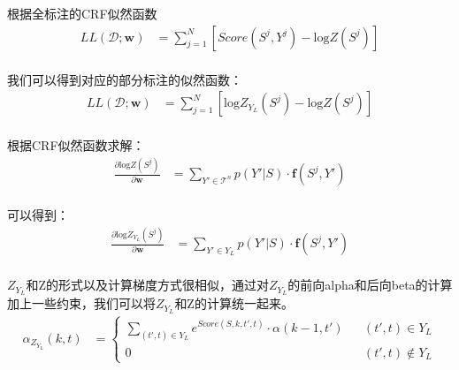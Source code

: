 \documentclass[a4paper, 11pt]{article}
\begin{document}
根据全标注的CRF似然函数
\begin{equation} \label{eq:ll}
\begin{split}
LL(\mathcal{D};\mathbf{w}) &= \sum_{j = 1}^N \left [ \textit{Score}(S^j, Y^j) - \mathrm{log}Z(S^j)\right  ]  \\						  
\end{split}
\end{equation}


我们可以得到对应的部分标注的似然函数：
\begin{equation} \label{eq:partial_ll}
\begin{split}
LL(\mathcal{D};\mathbf{w}) &= \sum_{j = 1}^N \left [\mathrm{log}Z_{Y_L}(S^j) - \mathrm{log}Z(S^j)\right ]  \\                                               
\end{split}
\end{equation}

根据CRF似然函数求解：
\begin{equation} \label{eq:logz-partial}
\begin{split}
\frac{\partial{\mathrm{log}Z(S^j)}}{\partial{\mathbf{w}}} &= \sum_{Y' \in \mathcal{T}^n} p(Y'|S)\cdot \mathbf{f}(S^j, Y') \\
\end{split}
\end{equation}

可以得到：
\begin{equation} \label{eq:logZ_Y_L-partial}
\begin{split}
\frac{\partial{\mathrm{log}Z_{Y_L}(S^j)}}{\partial{\mathbf{w}}} &= \sum_{Y' \in Y_L} p(Y'|S)\cdot \mathbf{f}(S^j, Y') \\
\end{split}
\end{equation}

$Z_{Y_L}$和{Z}的形式以及计算梯度方式很相似，通过对$Z_{Y_L}$的前向alpha和后向beta的计算加上一些约束，我们可以将$Z_{Y_L}$和Z的计算统一起来。
\begin{equation} \label{eq:alpha_z_y_l}
\begin{split}
\alpha_{Z_{Y_L}}(k, t) &=\left\{
\begin{array}{lcl} \sum_{(t',t) \in {Y_L}}e^{\textit{Score}(S, k, t', t)}\cdot \alpha(k - 1, t')	&	&{ (t', t) \in {Y_L}} \\
			    0		&	& {(t', t) \notin {Y_L}} 
\end{array} \right.
\end{split}
\end{equation}
\end{document}

